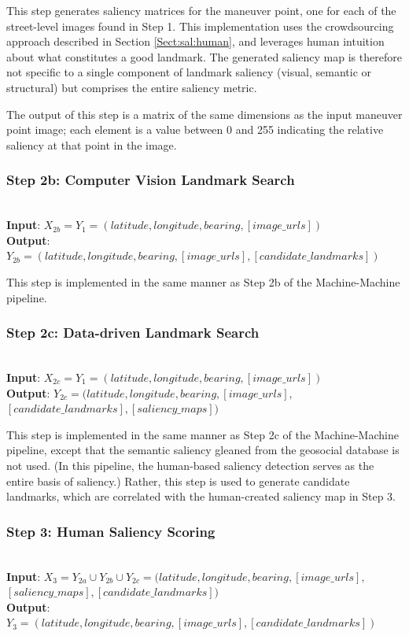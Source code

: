 This step generates saliency matrices for the maneuver point, one for each of the street-level images found in Step 1. This implementation uses the crowdsourcing approach described in Section \ref{Sect:sal:human}, and leverages human intuition about what constitutes a good landmark. The generated saliency map is therefore not specific to a single component of landmark saliency (visual, semantic or structural) but comprises the entire saliency metric. 

The output of this step is a matrix of the same dimensions as the input maneuver point image; each element is a value between 0 and 255 indicating the relative saliency at that point in the image.

\subsubsection*{Step 2b: Computer Vision Landmark Search}~\\
\noindent\textbf{Input}: $X_{2b} = Y_1 = (latitude, longitude, bearing, [image\_urls])$\\
\textbf{Output}: $Y_{2b} = (latitude, longitude, bearing,  [image\_urls], [candidate\_landmarks] )$ 

This step is implemented in the same manner as Step 2b of the Machine-Machine pipeline.

\subsubsection*{Step 2c: Data-driven Landmark Search}~\\
\noindent\textbf{Input}: $X_{2c} = Y_1 = (latitude, longitude, bearing, [image\_urls])$\\
\textbf{Output}: $Y_{2c} = (latitude, longitude, bearing,  [image\_urls], $\\$[candidate\_landmarks], [saliency\_maps] )$ 

This step is implemented in the same manner as Step 2c of the Machine-Machine pipeline, except that the semantic saliency gleaned from the geosocial database is not used. (In this pipeline, the human-based saliency detection serves as the entire basis of saliency.) Rather, this step is used to generate candidate landmarks, which are correlated with the human-created saliency map in Step 3.

\subsubsection*{Step 3: Human Saliency Scoring}~\\
\noindent\textbf{Input}: $X_3 = Y_{2a} \cup Y_{2b} \cup Y_{2c} = (latitude, longitude, bearing,  [image\_urls],$\\$ [saliency\_maps], [candidate\_landmarks] )$\\
\textbf{Output}: $Y_3 = (latitude, longitude, bearing,  [image\_urls], [candidate\_landmarks] )$ 

